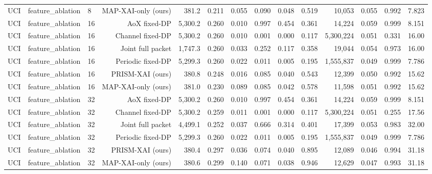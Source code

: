 \begin{longtable}{lllrrrrrrrrrrr}
UCI & feature\_ablation & 8 & MAP-XAI-only (ours) & 381.2 & 0.211 & 0.055 & 0.090 & 0.048 & 0.519 & 10,053 & 0.055 & 0.992 & 7.823 \\
UCI & feature\_ablation & 16 & AoX fixed-DP & 5,300.2 & 0.260 & 0.010 & 0.997 & 0.454 & 0.361 & 14,224 & 0.059 & 0.999 & 8.151 \\
UCI & feature\_ablation & 16 & Channel fixed-DP & 5,300.2 & 0.260 & 0.010 & 0.001 & 0.000 & 0.117 & 5,300,224 & 0.051 & 0.331 & 16.00 \\
UCI & feature\_ablation & 16 & Joint full packet & 1,747.3 & 0.260 & 0.033 & 0.252 & 0.117 & 0.358 & 19,044 & 0.054 & 0.973 & 16.00 \\
UCI & feature\_ablation & 16 & Periodic fixed-DP & 5,299.3 & 0.260 & 0.022 & 0.011 & 0.005 & 0.195 & 1,555,837 & 0.049 & 0.999 & 7.786 \\
UCI & feature\_ablation & 16 & PRISM-XAI (ours) & 380.8 & 0.248 & 0.016 & 0.085 & 0.040 & 0.543 & 12,399 & 0.050 & 0.992 & 15.62 \\
UCI & feature\_ablation & 16 & MAP-XAI-only (ours) & 381.0 & 0.230 & 0.089 & 0.085 & 0.042 & 0.578 & 11,598 & 0.051 & 0.992 & 15.62 \\
UCI & feature\_ablation & 32 & AoX fixed-DP & 5,300.2 & 0.260 & 0.010 & 0.997 & 0.454 & 0.361 & 14,224 & 0.059 & 0.999 & 8.151 \\
UCI & feature\_ablation & 32 & Channel fixed-DP & 5,300.2 & 0.259 & 0.011 & 0.001 & 0.000 & 0.117 & 5,300,224 & 0.051 & 0.255 & 17.56 \\
UCI & feature\_ablation & 32 & Joint full packet & 4,499.1 & 0.252 & 0.037 & 0.666 & 0.314 & 0.401 & 17,399 & 0.053 & 0.983 & 32.00 \\
UCI & feature\_ablation & 32 & Periodic fixed-DP & 5,299.3 & 0.260 & 0.022 & 0.011 & 0.005 & 0.195 & 1,555,837 & 0.049 & 0.999 & 7.786 \\
UCI & feature\_ablation & 32 & PRISM-XAI (ours) & 380.4 & 0.297 & 0.036 & 0.074 & 0.040 & 0.895 & 12,089 & 0.046 & 0.994 & 31.18 \\
UCI & feature\_ablation & 32 & MAP-XAI-only (ours) & 380.6 & 0.299 & 0.140 & 0.071 & 0.038 & 0.946 & 12,629 & 0.047 & 0.993 & 31.18 \\
\end{longtable}
